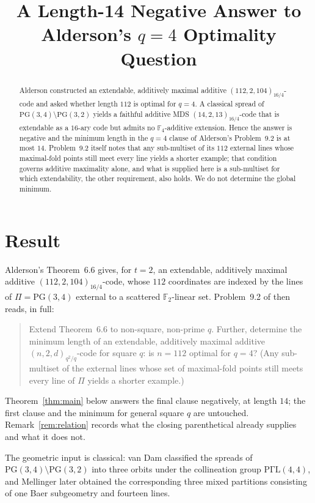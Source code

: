 \documentclass[11pt]{amsart}
\title[A length-14 negative answer]
{A Length-14 Negative Answer to Alderson's
$q=4$ Optimality Question}
\date{}
\theoremstyle{remark}
\newcommand{\F}{\mathbb F}
\newcommand{\PG}{\mathrm{PG}}
\begin{document}
\begin{abstract}
Alderson constructed an extendable, additively maximal additive
$(112,2,104)_{16/4}$-code and asked whether length $112$ is optimal for
$q=4$. A classical spread of
$\PG(3,4)\setminus\PG(3,2)$ yields a faithful additive MDS
$(14,2,13)_{16/4}$-code that is extendable as a $16$-ary code but admits no
$\F_4$-additive extension. Hence the answer is negative and the minimum
length in the $q=4$ clause of Alderson's Problem~9.2 is at most $14$.
Problem~9.2 itself notes that any sub-multiset of its $112$ external lines
whose maximal-fold points still meet every line yields a shorter example;
that condition governs additive maximality alone, and what is supplied here
is a sub-multiset for which extendability, the other requirement, also
holds. We do not determine the global minimum.
\end{abstract}

\maketitle

\section{Result}

Alderson's Theorem~6.6 gives, for $t=2$, an extendable, additively maximal
additive $(112,2,104)_{16/4}$-code, whose $112$ coordinates are indexed by
the lines of $\Pi=\PG(3,4)$ external to a scattered $\F_2$-linear set.
Problem~9.2 of \cite{Alderson} then reads, in full:
\begin{quote}
Extend Theorem~6.6 to non-square, non-prime $q$. Further, determine the
minimum length of an extendable, additively maximal additive
$(n,2,d)_{q^2/q}$-code for square $q$: is $n=112$ optimal for $q=4$? (Any
sub-multiset of the external lines whose set of maximal-fold points still
meets every line of $\Pi$ yields a shorter example.)
\end{quote}
Theorem~\ref{thm:main} below answers the final clause negatively, at length
$14$; the first clause and the minimum for general square $q$ are untouched.
Remark~\ref{rem:relation} records what the closing parenthetical already
supplies and what it does not.

The geometric input is classical: van Dam \cite{vanDam} classified the
spreads of $\PG(3,4)\setminus\PG(3,2)$ into three orbits under the
collineation group $\mathrm{P\Gamma L}(4,4)$, and Mellinger \cite{Mellinger}
later obtained the corresponding three mixed partitions consisting of one Baer
subgeometry and fourteen lines.
\end{document}
